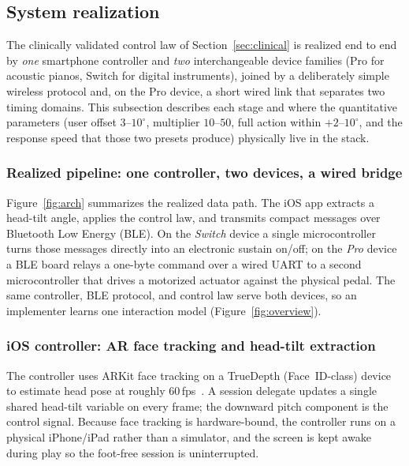 
\subsection{System realization}
\label{sec:realization}

The clinically validated control law of Section~\ref{sec:clinical} is realized
end to end by \emph{one} smartphone controller and \emph{two} interchangeable
device families (Pro for acoustic pianos, Switch for digital instruments), joined
by a deliberately simple wireless protocol and, on the Pro device, a short wired
link that separates two timing domains. This subsection describes each stage and
where the quantitative parameters (user offset $3$--$10^{\circ}$,
multiplier $10$--$50$, full action within $+2$--$10^{\circ}$, and the response
speed that those two presets produce) physically live in the stack.

\subsubsection{Realized pipeline: one controller, two devices, a wired bridge}
\label{sec:pipeline}
Figure~\ref{fig:arch} summarizes the realized data path. The iOS app extracts a
head-tilt angle, applies the control law, and transmits compact messages over
Bluetooth Low Energy (BLE). On the \emph{Switch} device a single
microcontroller turns those messages directly into an electronic sustain
on/off; on the \emph{Pro} device a BLE board relays a one-byte command over a
wired UART to a second microcontroller that drives a motorized actuator against
the physical pedal. The same controller, BLE protocol, and control law serve
both devices, so an implementer learns one interaction model
(Figure~\ref{fig:overview}).

\subsubsection{iOS controller: AR face tracking and head-tilt extraction}
\label{sec:ios-ar}
The controller uses ARKit face tracking on a TrueDepth (Face~ID-class) device to
estimate head pose at roughly $60$\,fps~\cite{arkit}. A session delegate updates
a single shared head-tilt variable on every frame; the downward pitch component
is the control signal. Because face tracking is hardware-bound, the controller
runs on a physical iPhone/iPad rather than a simulator, and the screen is kept
awake during play so the foot-free session is uninterrupted.

